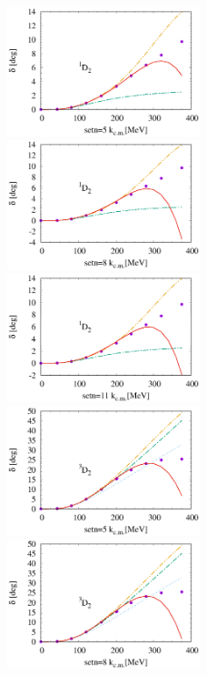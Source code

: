 \documentclass{article}
\begin{document}
\begin{figure}[htbp]

\includegraphics[width=0.5\textwidth]{5_1d2.eps}
\includegraphics[width=0.5\textwidth]{8_1d2.eps}
\includegraphics[width=0.5\textwidth]{11_1d2.eps}
\includegraphics[width=0.5\textwidth]{5_3d2.eps}
\includegraphics[width=0.5\textwidth]{8_3d2.eps}

\end{figure}
\end{document}
